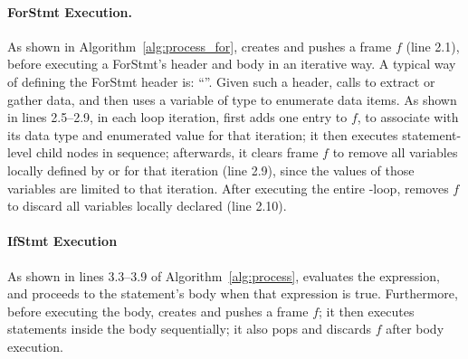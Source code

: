 \paragraph*{\textbf{ForStmt Execution.}}
As shown in Algorithm~\ref{alg:process_for}, \tool creates and pushes a frame $f$ (line 2.1), before executing a ForStmt's header and body in an iterative way. A typical way of defining the ForStmt header is: 
``''.   
Given such a header, \tool calls  to extract or gather data, and then uses a variable  of type  to enumerate data items. 
As shown in lines 2.5--2.9, in each loop iteration, 
\tool first adds one entry  to $f$, to associate  with its data type  and enumerated value  for that iteration; it then  executes statement-level child nodes in sequence; afterwards, it clears frame $f$ to remove all variables locally defined by or for that iteration (line 2.9), since the values of those variables are limited to that iteration.
After executing the entire -loop, \tool removes $f$ to discard all variables locally declared (line 2.10). 

\paragraph*{\textbf{IfStmt Execution}}
As shown in lines 3.3--3.9 of Algorithm~\ref{alg:process}, 
\tool evaluates the  expression, and proceeds to the statement's body when that expression is true.
Furthermore, before executing the body, \tool creates and pushes a frame $f$; it then executes statements inside the body sequentially; it also pops and discards $f$ after body execution.%

